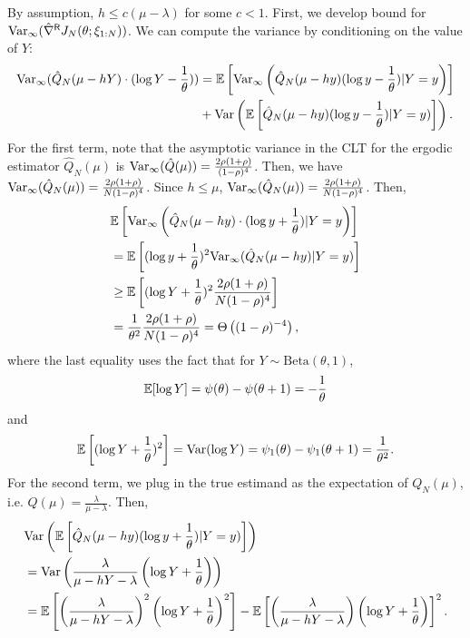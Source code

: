 By assumption, $h \leq c(\mu - \lambda)$ for some $c < 1$. First, we develop bound for ${\rm Var}_{\infty} (\hat{\nabla}^{\mathsf{R}} J_{N}(\theta; \xi_{1:N}))$.
We can compute the variance by conditioning on the value of $Y$:
\begin{align*}
    {\rm Var}_{\infty}(\hat{Q}_{N}(\mu-hY)\cdot(\log Y-\frac{1}{\theta}))&=\mathbb{E}\left[{\rm Var}_{\infty}\left(\hat{Q}_{N}(\mu-hy)(\log y-\frac{1}
{\theta})|Y=y\right)\right]\\
&+{\rm Var}\left(\mathbb{E}\left[\hat{Q}_{N}(\mu-hy)(\log y-\frac{1}{\theta})|Y=y)\right]\right).
\end{align*}
For the first term, note that the asymptotic variance in the CLT for the ergodic estimator $\hat{Q}_{N}(\mu)$ is ${\rm Var}_{\infty}(\hat Q(\mu))=\frac{2\rho(1+\rho)}{(1-\rho)^{4}}$. Then, we have ${\rm Var}_{\infty}(\hat{Q}_{N}(\mu)) = \frac{2\rho(1+\rho)}{N(1-\rho)^{4}}$. Since $h \leq \mu$, ${\rm Var}_{\infty}(\hat{Q}_{N}(\mu))= \frac{2\rho(1+\rho)}{N(1-\rho)^{4}}$.
Then,
\begin{align*}
&\mathbb{E} \left[ {\rm Var}_{\infty}\left(\hat{Q}_{N}(\mu-hy)\cdot(\log y+\frac{1}{\theta})|Y = y\right) \right] \\
& =\mathbb{E} \left[  (\log y+\frac{1}{\theta})^{2} {\rm Var}_{\infty}(\hat{Q}_{N}(\mu-hy)|Y = y) \right]\\
& \geq \mathbb{E} \left[  (\log Y+\frac{1}{\theta})^{2}
\frac{2\rho(1+\rho)}{N(1-\rho)^{4}} \right]\\
& = \frac{1}{\theta^{2}}
\frac{2\rho(1+\rho)}{N(1-\rho)^{4}}=\Theta\left( (1-\rho)^{-4} \right),
\end{align*}
where the last equality uses the fact that for $Y\sim\text{Beta}(\theta,1)$,
\[
\mathbb{E}[\log Y]=\psi(\theta) - \psi(\theta + 1)=-\frac{1}{\theta}
\]
and
\[
\mathbb{E} \left[  (\log Y+\frac{1}{\theta})^{2}\right]={\rm Var}(\log Y) = \psi_{1}(\theta) - \psi_{1}(\theta + 1) = \frac{1}{\theta^{2}}.
\]
For the second term, we plug in the true estimand as the expectation of $Q_{N}(\mu)$, i.e. $Q(\mu) = \frac{\lambda}{\mu - \lambda}$. Then,
\begin{align*}
&{\rm Var}\left(\mathbb{E}\left[\hat{Q}_{N}(\mu-hy)(\log y+\frac{1}{\theta})|Y=y)\right]\right) \\
& = {\rm Var}\left(\frac{\lambda}{\mu - hY - \lambda}
\left( \log Y + \frac{1}{\theta} \right)\right) \\
& = \mathbb{E} \left[ \left(\frac{\lambda}{\mu - hY - \lambda} \right)^{2}
\left( \log Y + \frac{1}{\theta} \right)^{2} \right]
- \mathbb{E} \left[ \left(\frac{\lambda}{\mu - hY - \lambda} \right)
\left( \log Y + \frac{1}{\theta} \right) \right]^{2}.
\end{align*}
